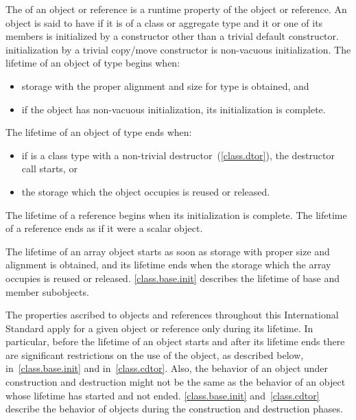 \pnum
{}%
%
The  of an object or reference is a runtime property of the
object or reference.
An object is said to have  if it is of a class or
aggregate type and it or one of its members is initialized by a constructor
other than a trivial default constructor. \enternote initialization by a
trivial copy/move constructor is non-vacuous initialization. \exitnote
The lifetime of an object of type  begins when:

\begin{itemize}
\item storage with the proper alignment and size for type  is
obtained, and

\item if the object has non-vacuous initialization, its initialization is complete.
\end{itemize}

The lifetime of an object of type  ends when:

\begin{itemize}
\item if  is a class type with a non-trivial
destructor~(\ref{class.dtor}), the destructor call starts, or

\item the storage which the object occupies is reused or released.
\end{itemize}

\pnum
The lifetime of a reference begins when its initialization is complete.
The lifetime of a reference ends as if it were a scalar object.

\pnum
\enternote The lifetime of an array object starts as soon as storage with proper size and
alignment is obtained, and its lifetime ends when the storage which the
array occupies is reused or released. \ref{class.base.init}
describes the lifetime of base and member subobjects. \exitnote

\pnum
The properties ascribed to objects and references throughout this International
Standard apply for a given object or reference only during its lifetime. \enternote
In particular, before the lifetime of an object starts and after its
lifetime ends there are significant restrictions on the use of the
object, as described below, in~\ref{class.base.init} and
in~\ref{class.cdtor}. Also, the behavior of an object under construction
and destruction might not be the same as the behavior of an object whose
lifetime has started and not ended. \ref{class.base.init}
and~\ref{class.cdtor} describe the behavior of objects during the
construction and destruction phases. \exitnote

